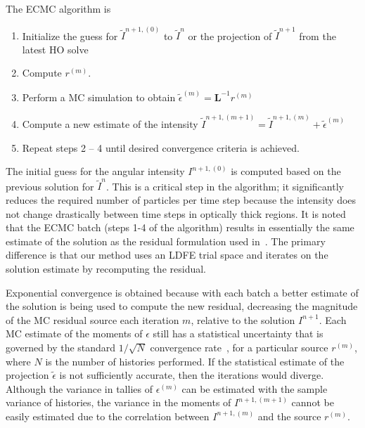 \documentclass[12pt]{article}
\newcommand{\B}[1]{\ensuremath{\mathbf{#1}}}
\begin{document}
\begin{center}
The ECMC algorithm is
\begin{enumerate}
    \item Initialize the guess for $\tilde{I}^{n+1,(0)}$ to $\tilde{I}^{n}$ or the
        projection of $\tilde{I}^{n+1}$ from the latest HO solve
\item Compute $r^{(m)}$.
\item Perform a MC simulation to obtain $\tilde{\epsilon}^{(m)} = \B L^{-1} r^{(m)}$
\item Compute a new estimate of the intensity $\tilde I^{n+1,(m+1)} = \tilde I^{n+1,(m)}
+ \tilde\epsilon^{(m)}$
\item Repeat steps 2 -- 4 until desired convergence criteria is achieved. 
\end{enumerate}
The initial guess for the angular intensity $I^{n+1,(0)}$ is computed based on the previous solution
for $\tilde{I}^{n}$. This is a critical step in the algorithm; it significantly reduces the required number of
particles per time step because the intensity does not change drastically between time steps in
optically thick regions.  It is noted that the ECMC batch (steps 1-4 of the
algorithm) results in essentially the same estimate of the solution as the residual
formulation used in~\cite{rmc}.  The primary difference is that our method uses an LDFE trial
space and iterates on the solution estimate by recomputing the residual.

Exponential convergence is obtained because with each batch a
better estimate of the solution is being used to compute the new residual, decreasing
the magnitude of the MC residual source each iteration $m$, relative to the solution
$I^{n+1}$.  Each MC
estimate of the moments of $\epsilon$ still has a statistical uncertainty that is
governed by the standard $1/\sqrt{N}$ convergence rate~\cite{shultis_mc}, for a
particular source $r^{(m)}$, where $N$ is the number of histories performed.  If the statistical estimate of the projection $\tilde\epsilon$ is not sufficiently
accurate, then the iterations would diverge.  Although the
variance in tallies of $\epsilon^{(m)}$ can be estimated with the sample variance of
histories, the variance in the moments of $I^{n+1,(m+1)}$ cannot be easily
estimated due to the correlation between $I^{n+1,(m)}$ and the source
$r^{(m)}$.


\end{center}
\end{document}
